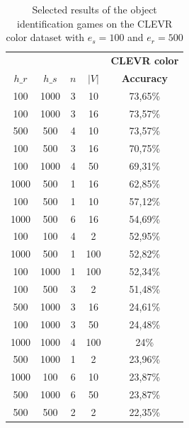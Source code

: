 \begin{table}[ht]
    \centering
    \begin{tabular}{cccc|c}
        \toprule
               &        &     &       & \multicolumn{1}{c}{\textbf{CLEVR color}} \\  \cmidrule(lr){5-5}
        $h\_r$ & $h\_s$ & $n$ & $|V|$ & \textbf{Accuracy}                        \\\midrule
        {100}  & {1000} & {3} & {10}  & {73,65\%}                                \\
        {100}  & {1000} & {3} & {16}  & {73,57\%}                                \\
        {500}  & {500}  & {4} & {10}  & {73,57\%}                                \\
        {100}  & {500}  & {3} & {16}  & {70,75\%}                                \\
        {100}  & {1000} & {4} & {50}  & {69,31\%}                                \\
        {1000} & {500}  & {1} & {16}  & {62,85\%}                                \\
        {100}  & {500}  & {1} & {10}  & {57,12\%}                                \\
        {1000} & {500}  & {6} & {16}  & {54,69\%}                                \\
        {100}  & {100}  & {4} & {2}   & {52,95\%}                                \\
        {1000} & {500}  & {1} & {100} & {52,82\%}                                \\
        {100}  & {1000} & {1} & {100} & {52,34\%}                                \\
        {100}  & {500}  & {3} & {2}   & {51,48\%}                                \\
        {500}  & {1000} & {3} & {16}  & {24,61\%}                                \\
        {100}  & {1000} & {3} & {50}  & {24,48\%}                                \\
        {1000} & {1000} & {4} & {100} & {24\%}                                   \\
        {500}  & {1000} & {1} & {2}   & {23,96\%}                                \\
        {1000} & {100}  & {6} & {10}  & {23,87\%}                                \\
        {500}  & {1000} & {6} & {50}  & {23,87\%}                                \\
        {500}  & {500}  & {2} & {2}   & {22,35\%}                                \\
        \bottomrule
    \end{tabular}
    \caption{Selected results of the object identification games on the CLEVR color dataset with $e_s=100$ and $e_r=500$}
    \label{tab:results_discriminator_color}
\end{table}

